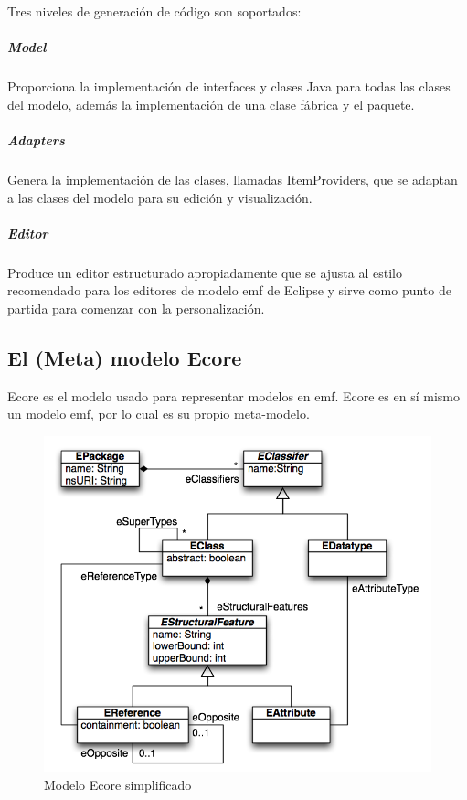 \documentclass[a4paper,12pt,oneside,spanish]{book}
\begin{document}
Tres niveles de generación de código son soportados:

\subparagraph{Model}

Proporciona la implementación de interfaces y clases Java para todas las clases del modelo, además la implementación de una clase fábrica y el paquete.

\subparagraph{Adapters}

Genera la implementación de las clases, llamadas ItemProviders, que se adaptan a las clases del modelo para su edición y visualización.

\subparagraph{Editor}

Produce un editor estructurado apropiadamente que se ajusta al estilo recomendado para los editores de modelo \gls{emf} de Eclipse y sirve como punto de partida para comenzar con la personalización.

\subsection{El (Meta) modelo Ecore}

Ecore es el modelo usado para representar modelos en \gls{emf}. Ecore es en sí mismo un modelo \gls{emf}, por lo cual es su propio meta-modelo. 

\begin{figure}[hbtp]
\centering
\includegraphics[scale=1]{./img/Ecore}
\caption{Modelo Ecore simplificado}
\label{fig:EcoreModel}
\end{figure}
\end{document}
